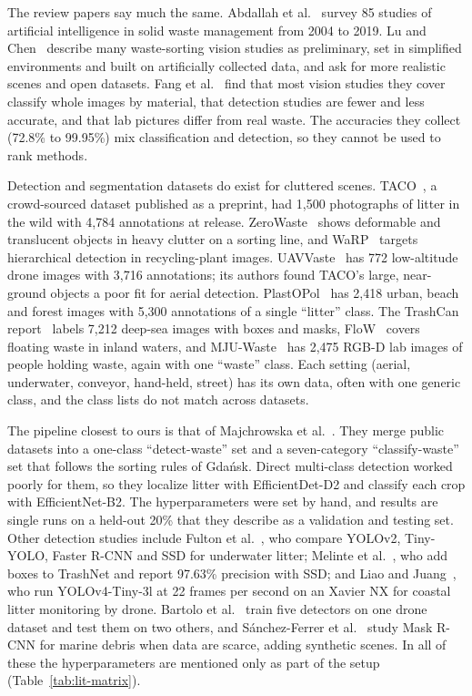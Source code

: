 The review papers say much the same. Abdallah et al.~\cite{abdallah2020artificial} survey 85 studies of artificial intelligence in solid waste management from 2004 to 2019. Lu and Chen~\cite{lu2022computer} describe many waste-sorting vision studies as preliminary, set in simplified environments and built on artificially collected data, and ask for more realistic scenes and open datasets. Fang et al.~\cite{fang2023artificial} find that most vision studies they cover classify whole images by material, that detection studies are fewer and less accurate, and that lab pictures differ from real waste. The accuracies they collect (72.8\% to 99.95\%) mix classification and detection, so they cannot be used to rank methods.

Detection and segmentation datasets do exist for cluttered scenes. TACO~\cite{proenca2020taco}, a crowd-sourced dataset published as a preprint, had 1,500 photographs of litter in the wild with 4,784 annotations at release. ZeroWaste~\cite{bashkirova2022zerowaste} shows deformable and translucent objects in heavy clutter on a sorting line, and WaRP~\cite{yudin2024hierarchical} targets hierarchical detection in recycling-plant images. UAVVaste~\cite{kraft2021autonomous} has 772 low-altitude drone images with 3,716 annotations; its authors found TACO's large, near-ground objects a poor fit for aerial detection. PlastOPol~\cite{cordova2022litter} has 2,418 urban, beach and forest images with 5,300 annotations of a single ``litter'' class. The TrashCan report~\cite{hong2020trashcan} labels 7,212 deep-sea images with boxes and masks, FloW~\cite{cheng2021flow} covers floating waste in inland waters, and MJU-Waste~\cite{wang2020multilevel} has 2,475 RGB-D lab images of people holding waste, again with one ``waste'' class. Each setting (aerial, underwater, conveyor, hand-held, street) has its own data, often with one generic class, and the class lists do not match across datasets.

The pipeline closest to ours is that of Majchrowska et al.~\cite{majchrowska2022deep}. They merge public datasets into a one-class ``detect-waste'' set and a seven-category ``classify-waste'' set that follows the sorting rules of Gda\'{n}sk. Direct multi-class detection worked poorly for them, so they localize litter with EfficientDet-D2 and classify each crop with EfficientNet-B2. The hyperparameters were set by hand, and results are single runs on a held-out 20\% that they describe as a validation and testing set. Other detection studies include Fulton et al.~\cite{fulton2019robotic}, who compare YOLOv2, Tiny-YOLO, Faster R-CNN and SSD for underwater litter; Melinte et al.~\cite{melinte2020deep}, who add boxes to TrashNet and report 97.63\% precision with SSD; and Liao and Juang~\cite{liao2022realtime}, who run YOLOv4-Tiny-3l at 22 frames per second on an Xavier NX for coastal litter monitoring by drone. Bartolo et al.~\cite{bartolo2025learning} train five detectors on one drone dataset and test them on two others, and S\'{a}nchez-Ferrer et al.~\cite{sanchezferrer2023experimental} study Mask R-CNN for marine debris when data are scarce, adding synthetic scenes. In all of these the hyperparameters are mentioned only as part of the setup (Table~\ref{tab:lit-matrix}).

